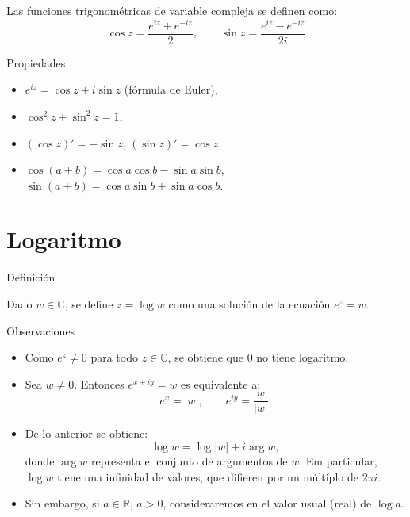 \documentclass[spanish,presentation]{beamer}
\begin{document}
\begin{frame}[label=sec-2-1]{}
\begin{definition}
Las funciones trigonométricas de variable compleja se definen
como:
\begin{displaymath}
\cos z=\frac{e^{iz}+e^{-iz}}{2},\qquad \sin z=\frac{e^{iz}-e^{-iz}}{2i}
\end{displaymath}
\end{definition}

\begin{block}{Propiedades}
\begin{itemize}
\item \(e^{iz}=\cos z+i\sin z\) (fórmula de Euler),
\item \(\cos^{2} z+\sin^{2}z=1\),
\item \((\cos z)'=-\sin z\), \((\sin z)'=\cos z\),
\item \(\cos(a+b)=\cos a\cos b-\sin a\sin b\), \(\sin(a+b)=\cos a\sin
      b+\sin a\cos b\).
\end{itemize}
\end{block}
\end{frame}

\section{Logaritmo}
\label{sec-3}

\begin{frame}[label=sec-3-1]{Definición}
\begin{definition}[Logaritmo]
Dado \(w\in \mathbb{C}\), se define \(z=\log w\) como una solución
de la ecuación \(e^{z}=w\).
\end{definition}
\end{frame}

\begin{frame}[label=sec-3-2]{}
\begin{block}{Observaciones}
\begin{itemize}
\item Como \(e^{z}\ne 0\) para todo \(z\in \mathbb{C}\), se obtiene
que \(0\) no tiene logaritmo.
\item Sea \(w\ne 0\). Entonces \(e^{x+iy}=w\) es equivalente a:
\begin{displaymath}
e^{x}=|w|,\qquad e^{iy}=\frac{w}{|w|}.
\end{displaymath}
\item De lo anterior se obtiene:
\begin{displaymath}
\log w = \log |w| +i\arg w,
\end{displaymath}
donde \(\arg w\) representa el conjunto de argumentos de
\(w\). Em particular, \(\log w\) tiene una infinidad de valores,
que difieren por un múltiplo de \(2\pi i\).
\item Sin embargo, si \(a\in\mathbb{R}\), \(a>0\), consideraremos en
el valor usual (real) de \(\log a\).
\end{itemize}
\end{block}
\end{frame}
\end{document}

